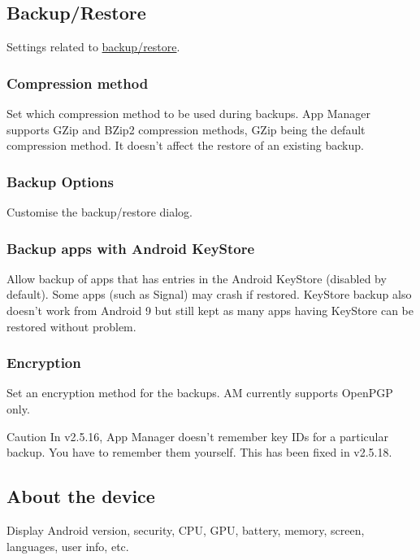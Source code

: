 \subsection{Backup/Restore}\label{subsec:backup/restore}
Settings related to \hyperref[sec:backup-restore]{backup/restore}.

\subsubsection{Compression method}
Set which compression method to be used during backups. App Manager supports GZip and BZip2 compression methods, GZip
being the default compression method. It doesn't affect the restore of an existing backup.

\subsubsection{Backup Options}\label{subsubsec:settings-backup-options}
Customise the backup/restore dialog.

\subsubsection{Backup apps with Android KeyStore}
Allow backup of apps that has entries in the Android KeyStore (disabled by default). Some apps (such as Signal) may
crash if restored. KeyStore backup also doesn't work from Android 9 but still kept as many apps having KeyStore can be
restored without problem.

\subsubsection{Encryption}\label{subsubsec:settings-encryption}
Set an encryption method for the backups. AM currently supports OpenPGP only.

\begin{warning}{Caution}
    In v2.5.16, App Manager doesn't remember key IDs for a particular backup. You have to remember them yourself. This has been fixed in v2.5.18.
\end{warning}

\subsection{About the device}\label{subsec:device-info}
Display Android version, security, CPU, GPU, battery, memory, screen, languages, user info, etc.
